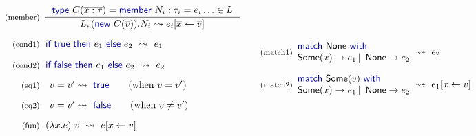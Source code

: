 \documentclass[10pt]{sigplanconf}
\newcommand{\kvd}[1]{\textnormal{\textcolor{kvdclr}{\sffamily #1}}}
\newcommand{\ident}[1]{\textnormal{\sffamily #1}}
\newcommand{\reduce}{\rightsquigarrow}
\begin{document}
\begin{figure}
\vspace{0.5em}
\noindent
\begin{equation*}
\begin{array}{rl}
 \textnormal{\footnotesize{(member)}}&
 \hspace{-0.6em}
 \inference
 { \kvd{type}~C(\overline{x:\tau})= \kvd{member}~N_i : \tau_i = e_i \ldots \in L }
 { L, (\kvd{new}~C(\overline{v})).N_i \reduce e_i[\overline{x} \leftarrow \overline{v}] }\\
 \\[-0.2em]
 \textnormal{\footnotesize{(cond1)}}&
 \hspace{-0.4em}
 \kvd{if}~\kvd{true}~\kvd{then}~e_1~\kvd{else}~e_2 ~\reduce~ e_1 \\
 \\[-0.2em]
 \textnormal{\footnotesize{(cond2)}}&
 \hspace{-0.4em}
 \kvd{if}~\kvd{false}~\kvd{then}~e_1~\kvd{else}~e_2 ~\reduce~ e_2 \\
 \\[-0.3em]
 \textnormal{\footnotesize{(eq1)}}&
 v=v'\reduce\kvd{true} \qquad (\textnormal{when}~v = v')\\
 \\[-0.3em]
 \textnormal{\footnotesize{(eq2)}}&
 v=v'\reduce\kvd{false} \qquad (\textnormal{when}~v \neq v')\\
 \\[-0.3em]
 \textnormal{\footnotesize{(fun)}}&
 \hspace{-0.4em}
 (\lambda x.e)~v ~\reduce~ e[x\leftarrow v] \\
\end{array}
\quad
\begin{array}{rl}
 \textnormal{\footnotesize{(match1)}}&
 \hspace{-1em}
 \begin{array}{l}
  \kvd{match}~\ident{None}~\kvd{with} \\
  \ident{Some}(x) \rightarrow e_1 \,|\, \ident{None} \rightarrow e_2
 \end{array} \hspace{-0.5em} ~\reduce~ e_2 \\
 \\[-0.2em]
 \textnormal{\footnotesize{(match2)}}&
 \hspace{-1em}
 \begin{array}{l}
    \kvd{match}~\ident{Some}(v)~\kvd{with} \\
    \ident{Some}(x) \rightarrow e_1 \,|\, \ident{None} \rightarrow e_2
 \end{array} \hspace{-0.5em} ~\reduce~ e_1[x\leftarrow v]\\

\end{array}
\end{equation*}
\end{figure}
\end{document}
